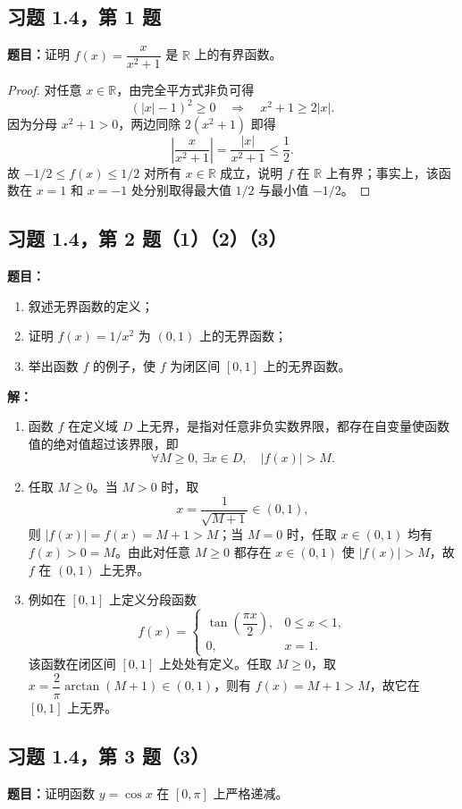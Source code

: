 \documentclass[UTF8, fontset=fandol, a4paper, 12pt]{ctexart}
\newcommand{\R}{\mathbb R}
\theoremstyle{definition}
\begin{document}
\subsection{习题 1.4，第 1 题}
\noindent\textbf{题目：}证明 $f(x)=\dfrac{x}{x^2+1}$ 是 $\R$ 上的有界函数。

\begin{proof}
对任意 $x\in\R$，由完全平方式非负可得
\[
 (|x|-1)^2\ge0
 \quad\Longrightarrow\quad
 x^2+1\ge2|x|.
\]
因为分母 $x^2+1>0$，两边同除 $2(x^2+1)$ 即得
\[
 \left|\frac{x}{x^2+1}\right|
 =\frac{|x|}{x^2+1}\le\frac12.
\]
故 $-1/2\le f(x)\le1/2$ 对所有 $x\in\R$ 成立，说明 $f$ 在 $\R$ 上有界；事实上，该函数在 $x=1$ 和 $x=-1$ 处分别取得最大值 $1/2$ 与最小值 $-1/2$。
\end{proof}

\subsection{习题 1.4，第 2 题（1）（2）（3）}
\noindent\textbf{题目：}
\begin{enumerate}[label=(\arabic*)]
 \item 叙述无界函数的定义；
 \item 证明 $f(x)=1/x^2$ 为 $(0,1)$ 上的无界函数；
 \item 举出函数 $f$ 的例子，使 $f$ 为闭区间 $[0,1]$ 上的无界函数。
\end{enumerate}

\noindent\textbf{解：}
\begin{enumerate}[label=(\arabic*)]
 \item 函数 $f$ 在定义域 $D$ 上无界，是指对任意非负实数界限，都存在自变量使函数值的绝对值超过该界限，即
 \[
 \forall M\ge0,\ \exists x\in D,\quad |f(x)|>M.
 \]
 \item 任取 $M\ge0$。当 $M>0$ 时，取
 \[
 x=\frac1{\sqrt{M+1}}\in(0,1),
 \]
 则 $|f(x)|=f(x)=M+1>M$；当 $M=0$ 时，任取 $x\in(0,1)$ 均有 $f(x)>0=M$。由此对任意 $M\ge0$ 都存在 $x\in(0,1)$ 使 $|f(x)|>M$，故 $f$ 在 $(0,1)$ 上无界。
 \item 例如在 $[0,1]$ 上定义分段函数
 \[
 f(x)=
 \begin{cases}
  \tan\!\left(\dfrac{\pi x}{2}\right),&0\le x<1,\\
  0,&x=1.
 \end{cases}
 \]
 该函数在闭区间 $[0,1]$ 上处处有定义。任取 $M\ge0$，取 $x=\dfrac2\pi\arctan(M+1)\in(0,1)$，则有 $f(x)=M+1>M$，故它在 $[0,1]$ 上无界。
\end{enumerate}

\subsection{习题 1.4，第 3 题（3）}
\noindent\textbf{题目：}证明函数 $y=\cos x$ 在 $[0,\pi]$ 上严格递减。
\end{document}
